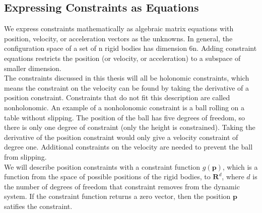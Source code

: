     \subsection{Expressing Constraints as Equations}
        We express constraints mathematically as algebraic matrix equations with position, velocity, or acceleration vectors as the unknowns. In general, the configuration space of a set of n rigid bodies has dimension 6n. Adding constraint equations restricts the position (or velocity, or acceleration) to a subspace of smaller dimension.\\

        The constraints discussed in this thesis will all be holonomic constraints, which means the constraint on the velocity can be found by taking the derivative of a position constraint. Constraints that do not fit this description are called nonholonomic. An example of a nonholonomic constraint is a ball rolling on a table without slipping. The position of the ball has five degrees of freedom, so there is only one degree of constraint (only the height is constrained). Taking the derivative of the position constraint would only give a velocity constraint of degree one. Additional constraints on the velocity are needed to prevent the ball from slipping.\\

        We will describe position constraints with a constraint function $g(\mathbf{p})$, which is a function from the space of possible positions of the rigid bodies, to $\mathbf{R}^d$, where $d$ is the number of degrees of freedom that constraint removes from the dynamic system. If the constraint function returns a zero vector, then the position $\mathbf{p}$ satifies the constraint. \\

